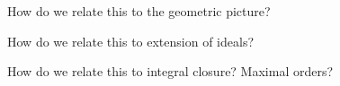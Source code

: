 How do we relate this to the geometric picture?

How do we relate this to extension of ideals?

How do we relate this to integral closure?  Maximal orders?


%
%
%
%
%
%
%

